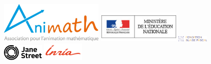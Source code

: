 \begin{figure}[h!]
	
	\vspace{1cm}
	
	\centering
  \begin{minipage}[c]{4cm}
     \centering
	   \includegraphics[width=5cm]{01-Intro/logos/animath.jpg}
   \end{minipage}

   \vspace{2cm}

   \begin{minipage}[c]{4cm}
   \centering
        \includegraphics[width=4cm]{01-Intro/logos/education_nationale.jpg}
   \end{minipage} \hfill
   \begin{minipage}[c]{2cm}
   \centering
      \includegraphics[width=1.5cm]{01-Intro/logos/fondation_blaise_pascal.jpg}
   \end{minipage}

   \bigskip

   \begin{minipage}[c]{2cm}
   \centering
   \includegraphics[width=2cm]{01-Intro/logos/jane_street.png}
   \end{minipage} \hskip 2cm \hfill
      \begin{minipage}[c]{2cm}
   \centering
        \includegraphics[width=2cm]{01-Intro/logos/inria.png}
   \end{minipage}
\end{figure}

\restoregeometry

\pagestyle{empty}~

